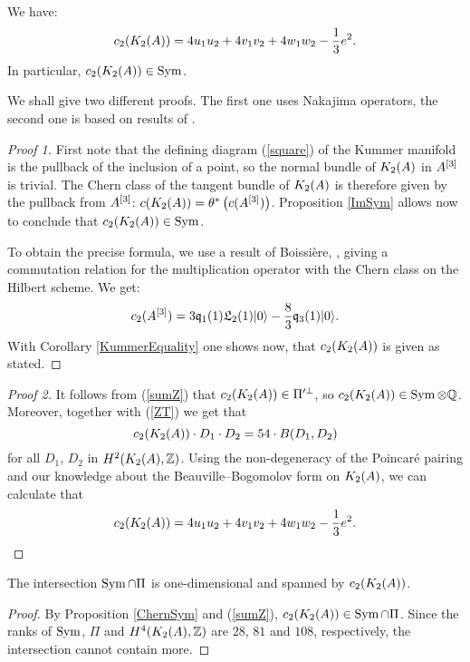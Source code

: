 \begin{proposition} \label{ChernSym}
We have:
\begin{equation}
c_2(K_{ 2 }( A ))= 4 u_1u_2 + 4v_1v_2 + 4 w_1 w_2 - \frac{1}{3} e^2. 
\end{equation}
In particular, $c_2(K_{ 2 }( A ))\in \operatorname{Sym} $.
\end{proposition}
We shall give two different proofs. The first one uses Nakajima operators, the second one is based on results of \cite{Hassett}.
\begin{proof}[Proof 1]
First note that the defining diagram (\ref{square}) of the Kummer manifold is the pullback of the inclusion of a point, so the normal bundle of $K_{ 2 }( A )$ in $A^{[3]}$ is trivial. The Chern class of the tangent bundle of $K_{ 2 }( A )$ is therefore given by the pullback from $A^{[3]}$: $c(K_{ 2 }( A )) = \theta^*\left(c(A^{[3]})\right)$. Proposition \ref{ImSym} allows now to conclude that $c_2(K_{ 2 }( A ))\in \operatorname{Sym}$.

To obtain the precise formula, we use a result of Boissi\`ere, \cite[Lemma 3.12]{Boissiere}, giving a commutation relation for the multiplication operator with the Chern class on the Hilbert scheme. We get:
$$
c_2(A^{[3]}) = 3\mathfrak{q}_1(1)\mathfrak L_2(1)|0\rangle - \frac{8}{3} \mathfrak{q}_3(1)|0\rangle.
$$
With Corollary \ref{KummerEquality} one shows now, that $c_2(K_{ 2 }( A ))$ is given as stated.
\end{proof}
\begin{proof}[Proof 2]
It follows from (\ref{sumZ}) that $c_2(K_{ 2 }( A ))\in \Pi'^\perp$, so $c_2(K_{ 2 }( A )) \in \operatorname{Sym}\otimes\mathbb{Q}$. Moreover, together with (\ref{ZT}) we get that
\begin{equation*}
c_2(K_{ 2 }( A ))\cdot D_{1}\cdot D_{2}=54\cdot B(D_{1},D_{2})
\end{equation*}
for all $D_{1}$, $D_{2}$ in $H^{2}(K_{ 2 }( A ),\mathbb{Z})$. Using the non-degeneracy of the Poincar\'e pairing and our knowledge about the Beauville--Bogomolov form on $K_{ 2 }( A )$, we can calculate that
$$
c_2(K_{ 2 }( A ))= 4 u_1u_2 + 4v_1v_2 + 4 w_1 w_2 - \frac{1}{3} e^2.  \qedhere
$$
\end{proof}


\begin{corollary}\label{Pi'}
The intersection $\operatorname{Sym}\cap \Pi$ is one-dimensional and spanned by $c_2(K_{ 2 }( A ))$. 
\end{corollary}
\begin{proof}
By Proposition \ref{ChernSym} and (\ref{sumZ}), $c_2(K_{ 2 }( A ))\in \operatorname{Sym}\cap \Pi$. Since the ranks of $\operatorname{Sym}$, $\Pi$ and $H^4(K_{ 2 }( A ),\mathbb{Z})$ are $28$, $81$ and $108$, respectively, the intersection cannot contain more.
\end{proof}

